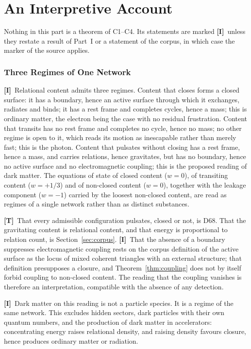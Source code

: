 \documentclass[11pt,a4paper]{article}
\theoremstyle{plain}
\theoremstyle{definition}
\theoremstyle{remark}
\newcommand{\statT}{\textbf{[T]}}
\newcommand{\statI}{\textbf{[I]}}
\begin{document}
\part{An Interpretive Account}

Nothing in this part is a theorem of C1--C4. Its statements are marked \statI\ unless they restate a result of Part~I or a statement of the corpus, in which case the marker of the source applies.

\section{Three Regimes of One Network}
\label{sec:regimes}

\statI\ Relational content admits three regimes. Content that closes forms a closed surface: it has a boundary, hence an active surface through which it exchanges, radiates and binds; it has a rest frame and completes cycles, hence a mass; this is ordinary matter, the electron being the case with no residual frustration. Content that transits has no rest frame and completes no cycle, hence no mass; no other regime is open to it, which reads its motion as inescapable rather than merely fast; this is the photon. Content that pulsates without closing has a rest frame, hence a mass, and carries relations, hence gravitates, but has no boundary, hence no active surface and no electromagnetic coupling; this is the proposed reading of dark matter. The equations of state of closed content ($w=0$), of transiting content ($w=+1/3$) and of non-closed content ($w=0$), together with the leakage component ($w=-1$) carried by the loosest non-closed content, are read as regimes of a single network rather than as distinct substances.

\statT\ That every admissible configuration pulsates, closed or not, is D68. That the gravitating content is relational content, and that energy is proportional to relation count, is Section~\ref{sec:corpus}. \statI\ That the absence of a boundary suppresses electromagnetic coupling rests on the corpus definition of the active surface as the locus of mixed coherent triangles with an external structure; that definition presupposes a closure, and Theorem~\ref{thm:coupling} does not by itself forbid coupling to non-closed content. The reading that the coupling vanishes is therefore an interpretation, compatible with the absence of any detection.

\statI\ Dark matter on this reading is not a particle species. It is a regime of the same network. This excludes hidden sectors, dark particles with their own quantum numbers, and the production of dark matter in accelerators: concentrating energy raises relational density, and raising density favours closure, hence produces ordinary matter or radiation.
\end{document}
